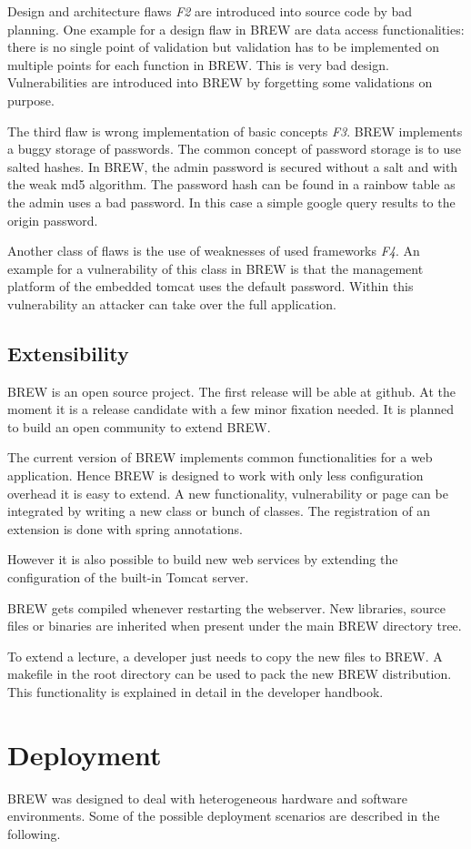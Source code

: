 \documentclass{llncs}
\begin{document}
Design and architecture flaws {\em F2} are introduced into source code by bad planning. One example for a design flaw in BREW are data access functionalities: there is no single point of validation but validation has to be implemented on multiple points for each function in BREW. This is very bad design. Vulnerabilities are introduced into BREW by forgetting some validations on purpose.

The third flaw is wrong implementation of basic concepts {\em F3}. BREW implements a buggy storage of passwords. The common concept of password storage is to use salted hashes. In BREW, the admin password is secured without a salt and with the weak md5 algorithm. The password hash can be found in a rainbow table as the admin uses a bad password. In this case a simple google query results to the origin password.

Another class of flaws is the use of weaknesses of used frameworks {\em F4}.
An example for a vulnerability of this class in BREW is that the management platform of the embedded tomcat uses the default password. Within this vulnerability an attacker can take over the full application.
\subsection{Extensibility}
BREW is an open source project.
The first release will be able at github.
At the moment it is a release candidate with a few minor fixation needed.
It is planned to build an open community to extend BREW.

The current version of BREW implements common functionalities for a web application.
Hence BREW is designed to work with only less configuration overhead it is easy to extend.
A new functionality, vulnerability or page can be integrated by writing a new class or bunch of classes.
The registration of an extension is done with spring annotations.

However it is also possible to build new web services by extending the configuration of the built-in Tomcat server.

BREW gets compiled whenever restarting the webserver.
New libraries, source files or binaries are inherited when present under the main BREW directory tree.

To extend a lecture, a developer just needs to copy the new files to BREW.
A makefile in the root directory can be used to pack the new BREW distribution.
This functionality is explained in detail in the developer handbook.
\section{Deployment}\label{sec:deploy}
BREW was designed to deal with heterogeneous hardware and software environments. Some of the possible deployment scenarios are described in the following. 
\end{document}
